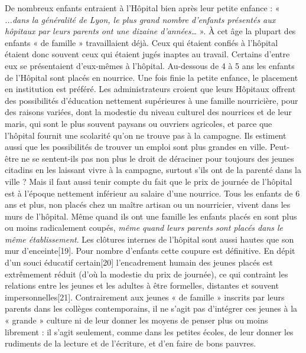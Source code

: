  De nombreux enfants entraient à l'Hôpital bien après leur petite enfance : « \emph{...dans la généralité de Lyon, le plus grand nombre d'enfants présentés aux hôpitaux par leurs parents ont une dizaine d'années…} ». À cet âge la plupart des enfants « de famille » travaillaient déjà. Ceux qui étaient confiés à l'hôpital étaient donc souvent ceux qui étaient jugés inaptes au travail. Certains d'entre eux se présentaient d'eux-mêmes à l'hôpital. 
 Au-dessous de 4 à 5 ans les enfants de l'Hôpital sont placés en nourrice. Une fois finie la petite enfance, le placement en institution est préféré. Les administrateurs croient que leurs Hôpitaux offrent des possibilités d'éducation nettement supérieures à une famille nourricière, pour des raisons variées, dont la modestie du niveau culturel des nourrices et de leur maris, qui sont le plus souvent paysans ou ouvriers agricoles, et parce que l'hôpital fournit une scolarité qu'on ne trouve pas à la campagne. Ils estiment aussi que les possibilités de trouver un emploi sont plus grandes en ville. Peut-être ne se sentent-ils pas non plus le droit de déraciner pour toujours des jeunes citadins en les laissant vivre à la campagne, surtout s'ils ont de la parenté dans la ville ? Mais il faut aussi tenir compte du fait que le prix de journée de l'hôpital est à l'époque nettement inférieur au salaire d'une nourrice.
 Tous les enfants de 6 ans et plus, non placés chez un maître artisan ou un nourricier, vivent dans les murs de l'hôpital. Même quand ils ont une famille les enfants placés en sont plus ou moins radicalement coupés, \emph{même quand leurs parents sont placés dans le même établissement}. Les clôtures internes de l'hôpital sont aussi hautes que son mur d'enceinte[19]. Pour nombre d'enfants cette coupure est définitive. 
 En dépit d'un souci éducatif certain[20] l'encadrement humain des jeunes placés est extrêmement réduit (d'où la modestie du prix de journée), ce qui contraint les relations entre les jeunes et les adultes à être formelles, distantes et souvent impersonnelles[21]. Contrairement aux jeunes « de famille » inscrits par leurs parents dans les collèges contemporains, il ne s'agit pas d'intégrer ces jeunes à la « grande » culture ni de leur donner les moyens de penser plus ou moins librement : il s'agit seulement, comme dans les petites écoles, de leur donner les rudiments de la lecture et de l'écriture, et d'en faire de bons pauvres.
